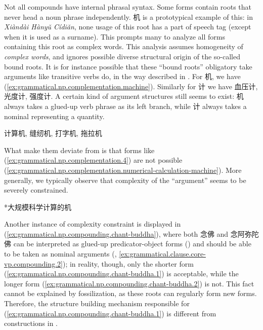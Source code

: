 \documentclass[UTF8, a4paper, oneside, scheme=plain, 12pt]{ctexrep}
\newcommand*{\term}[1]{\emph{#1}}
\newcommand{\work}[1]{\textit{#1}}
\begin{document}
Not all compounds have internal phrasal syntax.
Some forms contain roots that never head a noun phrase independently.
机 is a prototypical example of this:
in \work{Xiàndài Hànyǔ Cídiǎn}, none usage of this root has a part of speech tag
(except when it is used as a surname).
This prompts many to analyze all forms containing this root as complex words.
This analysis assumes homogeneity of \term{complex words},
and ignores possible diverse structural origin of the so-called bound roots.
It is for instance possible that these ``bound roots'' 
obligatory take arguments like transitive verbs do,
in the way described in .
For 机, we have (\ref{ex:grammatical.np.complementation.machine}).
Similarly for 计 we have 血压计, 光度计, 强度计.
A certain kind of argument structures still seems to exist:
机 always takes a glued-up verb phrase as its left branch,
while 计 always takes a nominal representing a quantity.

\begin{exe}
    \ex\label{ex:grammatical.np.complementation.machine}  计算机, 缝纫机, 打字机, 拖拉机
\end{exe}

What make them deviate from  is that forms like (\ref{ex:grammatical.np.complementation.4}) are not possible
(\ref{ex:grammatical.np.complementation.numerical-calculation-machine}).
More generally, we typically observe that complexity of the ``argument'' seems to be severely constrained.

\begin{exe}
    \ex\label{ex:grammatical.np.complementation.numerical-calculation-machine} *大规模科学计算的机
\end{exe}

Another instance of complexity constraint 
is displayed in (\ref{ex:grammatical.np.compounding.chant-buddha}),
where both 念佛 and 念阿弥陀佛 can be interpreted as glued-up predicator-object forms ()
and should be able to be taken as nominal arguments
(, \ref{ex:grammatical.clause.core-vp.compounding.2});
in reality, though, only the shorter form (\ref{ex:grammatical.np.compounding.chant-buddha.1}) is acceptable,
while the longer form (\ref{ex:grammatical.np.compounding.chant-buddha.2}) is not.
This fact cannot be explained by fossilization,
as these roots can regularly form new forms.
Therefore, the structure building mechanism responsible for (\ref{ex:grammatical.np.compounding.chant-buddha.1})
is different from constructions in .
\end{document}
